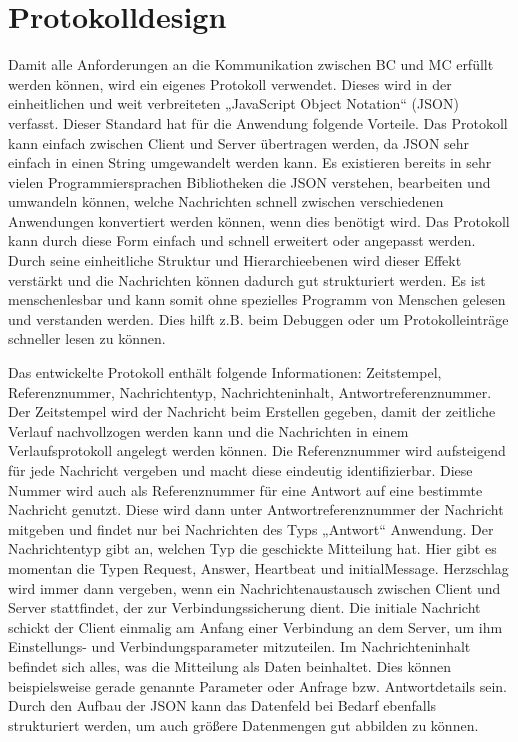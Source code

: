\documentclass[thesis.tex]{subfiles}
\begin{document}
\section{Protokolldesign}\label{chap:protokolldesign}
Damit alle Anforderungen an die Kommunikation zwischen BC und MC erfüllt werden können, wird ein eigenes Protokoll verwendet.
Dieses wird in der einheitlichen und weit verbreiteten „JavaScript Object Notation“ (JSON) verfasst.
Dieser Standard hat für die Anwendung folgende Vorteile.
Das Protokoll kann einfach zwischen Client und Server übertragen werden, da JSON sehr einfach in einen String umgewandelt werden kann.
Es existieren bereits in sehr vielen Programmiersprachen Bibliotheken die JSON verstehen, bearbeiten und umwandeln können,
welche Nachrichten schnell zwischen verschiedenen Anwendungen konvertiert werden können, wenn dies benötigt wird.
Das Protokoll kann durch diese Form einfach und schnell erweitert oder angepasst werden.
Durch seine einheitliche Struktur und Hierarchieebenen wird dieser Effekt verstärkt und die Nachrichten können dadurch gut strukturiert werden.
Es ist menschenlesbar und kann somit ohne spezielles Programm von Menschen gelesen und verstanden werden.
Dies hilft z.B. beim Debuggen oder um Protokolleinträge schneller lesen zu können.

Das entwickelte Protokoll enthält folgende Informationen: Zeitstempel, Referenznummer, Nachrichtentyp, Nachrichteninhalt, Antwortreferenznummer.
Der Zeitstempel wird der Nachricht beim Erstellen gegeben, damit der zeitliche Verlauf nachvollzogen werden kann und die
Nachrichten in einem Verlaufsprotokoll angelegt werden können.
Die Referenznummer wird aufsteigend für jede Nachricht vergeben und macht diese eindeutig identifizierbar.
Diese Nummer wird auch als Referenznummer für eine Antwort auf eine bestimmte Nachricht genutzt.
Diese wird dann unter Antwortreferenznummer der Nachricht mitgeben und findet nur bei Nachrichten des Typs „Antwort“ Anwendung.
Der Nachrichtentyp gibt an, welchen Typ die geschickte Mitteilung hat.
Hier gibt es momentan die Typen Request, Answer, Heartbeat und initialMessage.
Herzschlag wird immer dann vergeben, wenn ein Nachrichtenaustausch zwischen Client und Server stattfindet, der zur Verbindungssicherung dient.
Die initiale Nachricht schickt der Client einmalig am Anfang einer Verbindung an dem Server,
um ihm Einstellungs- und Verbindungsparameter mitzuteilen.
Im Nachrichteninhalt befindet sich alles, was die Mitteilung als Daten beinhaltet.
Dies können beispielsweise gerade genannte Parameter oder Anfrage bzw. Antwortdetails sein.
Durch den Aufbau der JSON kann das Datenfeld bei Bedarf ebenfalls strukturiert werden, um auch größere Datenmengen gut abbilden zu können.
\end{document}
